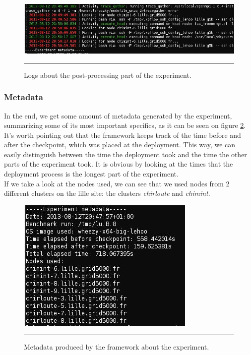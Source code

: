 \begin{figure}[htbp]
  \centering
    \includegraphics[scale=0.6]{./Figures/fex_postprocessing.jpg}
    \rule{35em}{0.5pt}
  \caption[Post-processing]{Logs about the post-processing part of the
    experiment.}
  \label{fig:fex_postprocessing}
\end{figure}

\subsubsection{Metadata}
In the end, we get some amount of metadata generated by the
experiment, summarizing some of its most important specifics, as it
can be seen on figure \ref{fig:fex_metadata}.\\[0.3cm]
It's worth pointing out that the framework keeps track of the time
before and after the checkpoint, which was placed at the
deployment. This way, we can easily distinguish between the time the
deployment took and the time the other parts of the experiment
took. It is obvious by looking at the times that the deployment
process is the longest part of the experiment.\\[0.3cm]
If we take a look at the nodes used, we can see that we used nodes
from 2 different clusters on the lille site: the
clusters \emph{chirloute} and \emph{chimint}.

\begin{figure}[htbp]
  \centering
    \includegraphics[scale=0.7]{./Figures/fex_metadata.jpg}
    \rule{35em}{0.5pt}
  \caption[Metadata]{Metadata produced by the framework about the
    experiment.}
  \label{fig:fex_metadata}
\end{figure}

